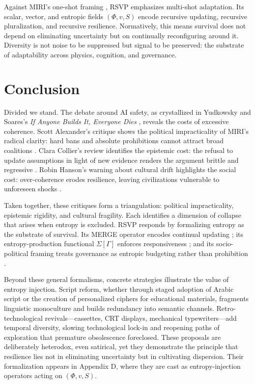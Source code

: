 \documentclass[12pt]{article}
\begin{document}
Against MIRI’s one-shot framing \citep{yudkowsky2025IABIED}, RSVP emphasizes multi-shot adaptation. 
Its scalar, vector, and entropic fields $(\Phi, v, S)$ encode recursive updating, recursive pluralization, and recursive resilience. 
Normatively, this means survival does not depend on eliminating uncertainty but on continually reconfiguring around it. 
Diversity is not noise to be suppressed but signal to be preserved: the substrate of adaptability across physics, cognition, and governance.

\section{Conclusion}
Divided we stand. The debate around AI safety, as crystallized in Yudkowsky and Soares’s \textit{If Anyone Builds It, Everyone Dies} \citep{yudkowsky2025IABIED}, reveals the costs of excessive coherence. Scott Alexander’s critique shows the political impracticality of MIRI’s radical clarity: hard bans and absolute prohibitions cannot attract broad coalitions \citep{alexander2025reviewIABIED}. Clara Collier’s review identifies the epistemic cost: the refusal to update assumptions in light of new evidence renders the argument brittle and regressive \citep{collier2025reviewIABIED}. Robin Hanson’s warning about cultural drift highlights the social cost: over-coherence erodes resilience, leaving civilizations vulnerable to unforeseen shocks \citep{hanson2024culturaldrift}.

Taken together, these critiques form a triangulation: political impracticality, epistemic rigidity, and cultural fragility. Each identifies a dimension of collapse that arises when entropy is excluded. RSVP responds by formalizing entropy as the substrate of survival. Its MERGE operator encodes continual updating \citep{lurie2009higher}; its entropy-production functional $\Sigma[\Gamma]$ enforces responsiveness \citep{verlinde2011entropic}; and its socio-political framing treats governance as entropic budgeting rather than prohibition \citep{landauer1961irreversibility}.

Beyond these general formalisms, concrete strategies illustrate the value of entropy injection. Script reform, whether through staged adoption of Arabic script or the creation of personalized ciphers for educational materials, fragments linguistic monoculture and builds redundancy into semantic channels. Retro-technological revivals—cassettes, CRT displays, mechanical typewriters—add temporal diversity, slowing technological lock-in and reopening paths of exploration that premature obsolescence foreclosed. These proposals are deliberately heterodox, even satirical, yet they demonstrate the principle that resilience lies not in eliminating uncertainty but in cultivating dispersion. Their formalization appears in Appendix D, where they are cast as entropy-injection operators acting on $(\Phi,v,S)$.
\end{document}

